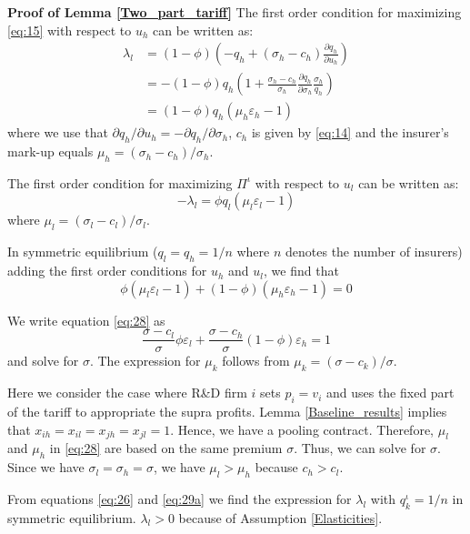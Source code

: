 \documentclass[a4paper,12pt]{article}
\begin{document}
\textbf{Proof of Lemma \ref{Two_part_tariff}}
The first order condition for maximizing \eqref{eq:15}  with respect to \(u_h\) can be written as:
\begin{align}
\nonumber
\lambda_l &= (1-\phi) \left(-q_h + (\sigma_h-c_h) \frac{\partial q_h}{\partial u_h}   \right)\\
\nonumber &=- (1-\phi) q_h \left(1 + \frac{\sigma_h-c_h}{\sigma_h} \frac{\partial q_h}{\partial \sigma_h} \frac{\sigma_h}{q_{h}}   \right)\\
\label{eq:26}
          & = (1-\phi) q_h (\mu_h \varepsilon_h-1)
\end{align}
where we use that \(\partial q_h/\partial u_h = - \partial q_h/\partial \sigma_h\), \(c_h\) is given by \eqref{eq:14} and the insurer's mark-up equals \(\mu_h = (\sigma_{h}-c_h)/\sigma_h\).

The first order condition for maximizing \(\Pi^{\iota}\) with respect to \(u_l\) can be written as:
\begin{equation}
\label{eq:36}
-\lambda_l = \phi q_l (\mu_l \varepsilon_l -1)
\end{equation}
where \(\mu_l=(\sigma_l-c_l)/\sigma_l\).

In symmetric equilibrium (\(q_l=q_h=1/n\) where \(n\) denotes the number of insurers) adding the first order conditions for \(u_h\) and \(u_l\), we find that
\begin{equation}
\label{eq:28}
\phi (\mu_l \varepsilon_l-1) + (1-\phi) (\mu_h \varepsilon_h -1) = 0
\end{equation}

We write equation \eqref{eq:28} as
\begin{equation}
\label{eq:31}
\frac{\sigma-c_l}{\sigma}\phi \varepsilon_l+\frac{\sigma-c_h}{\sigma}(1-\phi) \varepsilon_h = 1
\end{equation}
and solve for \(\sigma\). The expression for \(\mu_k\) follows from \(\mu_k=(\sigma-c_k)/\sigma\).

Here we consider the case where R\&D firm \(i\) sets \(p_i=v_i\) and uses the fixed part of the tariff to appropriate the supra profits. Lemma \ref{Baseline_results} implies that \(x_{ih}=x_{il}=x_{jh}=x_{jl}=1\). Hence, we have a pooling contract. Therefore, \(\mu_l\) and \(\mu_h\) in \eqref{eq:28} are based on the same premium \(\sigma\). Thus, we can solve for \(\sigma\). Since we have \(\sigma_l=\sigma_h=\sigma\), we have \(\mu_l > \mu_h\) because \(c_h>c_l\).

From equations \eqref{eq:26} and \eqref{eq:29a} we find the expression for \(\lambda_l\) with \(q_k^{\iota}=1/n\) in symmetric equilibrium. \(\lambda_l>0\) because of Assumption \ref{Elasticities}.
\end{document}
